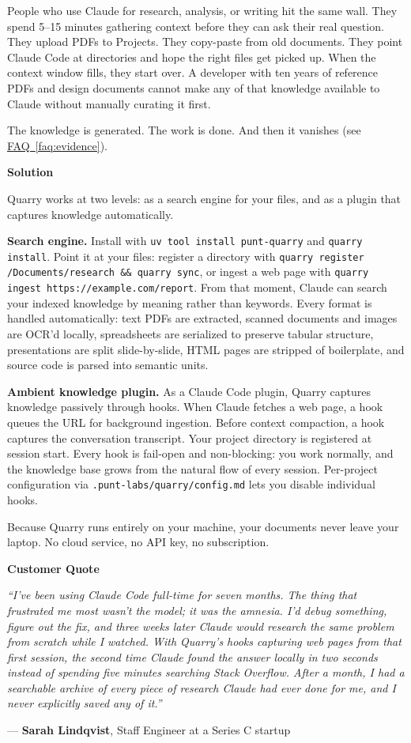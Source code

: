 \documentclass[11pt,letterpaper]{article}
\newcommand{\prsection}[1]{%
  \vspace{1em}%
  {\large\bfseries\color{SectionBlue}#1}%
  \vspace{0.3em}\par%
}
\newcommand{\faqref}[1]{\hyperref[#1]{FAQ~\ref*{#1}}}
\begin{document}
People who use Claude for research, analysis, or writing hit the same wall.
They spend 5--15 minutes gathering context before they can ask their real
question. They upload PDFs to Projects. They copy-paste from old documents.
They point Claude Code at directories and hope the right files get picked up.
When the context window fills, they start over. A developer with ten years of
reference PDFs and design documents cannot make any of that knowledge available
to Claude without manually curating it first.

The knowledge is generated. The work is done. And then it vanishes
(see \faqref{faq:evidence}).

\prsection{Solution}

Quarry works at two levels: as a search engine for your files, and as a plugin
that captures knowledge automatically.

\textbf{Search engine.} Install with \texttt{uv tool install punt-quarry} and
\texttt{quarry install}. Point it at your files: register a directory with
\texttt{quarry register \texttildelow/Documents/research \&\& quarry sync}, or
ingest a web page with \texttt{quarry ingest https://example.com/report}. From
that moment,
Claude can search your indexed knowledge by meaning rather than keywords. Every
format is handled automatically: text PDFs are extracted, scanned documents and
images are OCR'd locally, spreadsheets are serialized to preserve tabular
structure, presentations are split slide-by-slide, HTML pages are stripped of
boilerplate, and source code is parsed into semantic units.

\textbf{Ambient knowledge plugin.} As a Claude Code plugin, Quarry captures
knowledge passively through hooks. When Claude fetches a web page, a hook
queues the URL for background ingestion. Before context compaction, a hook
captures the conversation transcript. Your project directory is registered at
session start. Every hook is fail-open and non-blocking: you work normally, and
the knowledge base grows from the natural flow of every session. Per-project
configuration via \texttt{.punt-labs/quarry/config.md} lets you disable
individual hooks.

Because Quarry runs entirely on your machine, your documents never leave your
laptop. No cloud service, no API key, no subscription.

\prsection{Customer Quote}

\begin{customerquote}
\textit{``I've been using Claude Code full-time for seven months. The thing
that frustrated me most wasn't the model; it was the amnesia. I'd debug
something, figure out the fix, and three weeks later Claude would research the
same problem from scratch while I watched. With Quarry's hooks capturing web
pages from that first session, the second time Claude found the answer locally
in two seconds instead of spending five minutes searching Stack Overflow. After
a month, I had a searchable archive of every piece of research Claude had ever
done for me, and I never explicitly saved any of it.''}

\raggedleft --- \textbf{Sarah Lindqvist}, Staff Engineer at a Series C startup
\end{customerquote}
\end{document}
